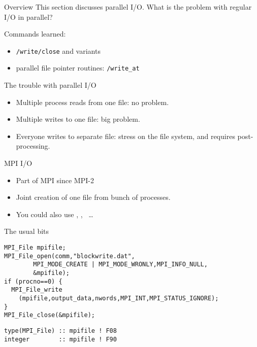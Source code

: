 
\begin{frame}[containsverbatim]{Overview}
  This section discusses parallel I/O. What is the problem with
  regular I/O in parallel?

  Commands learned:
  \begin{itemize}
  \item {}\lstinline{/write/close} and variants
  \item parallel file pointer routines: \lstinline{/write_at}
  \end{itemize}
\end{frame}

\begin{frame}{The trouble with parallel I/O}
  \begin{itemize}
  \item Multiple process reads from one file: no problem.
  \item Multiple writes to one file: big problem.
  \item Everyone writes to separate file: stress on the file system,
    and requires post-processing.
  \end{itemize}
\end{frame}

\begin{frame}{MPI I/O}
  \begin{itemize}
  \item Part of MPI since MPI-2
  \item Joint creation of one file from bunch of processes.
  \item You could also use , , ~\ldots
  \end{itemize}
\end{frame}

\begin{frame}[containsverbatim]{The usual bits}
\small
\lstset{language=C}
\begin{lstlisting}
MPI_File mpifile;
MPI_File_open(comm,"blockwrite.dat",
        MPI_MODE_CREATE | MPI_MODE_WRONLY,MPI_INFO_NULL,
        &mpifile);
if (procno==0) {
  MPI_File_write
    (mpifile,output_data,nwords,MPI_INT,MPI_STATUS_IGNORE);
}
MPI_File_close(&mpifile);
\end{lstlisting}
\lstset{language=Fortran}
\begin{lstlisting}
type(MPI_File) :: mpifile ! F08
integer        :: mpifile ! F90
\end{lstlisting}
\end{frame}


